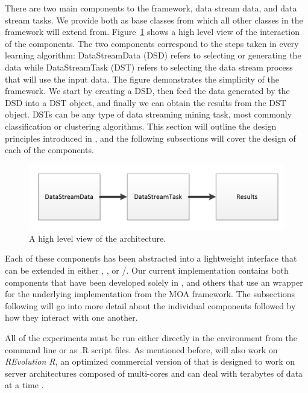 \documentclass[nojss]{jss}
\begin{document}
There are two main components to the  framework, data stream data, and data stream tasks. We provide both as base classes from which all other classes in the framework will extend from. Figure~\ref{figure:workflow}  shows a high level view of the interaction of the components. The two components correspond to the steps taken in every learning algorithm: DataStreamData (DSD) refers to selecting or generating the data while DataStreamTask (DST) refers to selecting the data stream process that will use the input data. The figure demonstrates the simplicity of the framework. We start by creating a DSD, then feed the data generated by the DSD into a DST object, and finally we can obtain the results from the DST object. DSTs can be any type of data streaming mining task, most commonly classification or clustering algorithms. This section will outline the design principles introduced in , and the following subsections will cover the design of each of the components. 

\begin{figure}
\centering
\includegraphics{architecture}
\caption{A high level view of the  architecture.}
\label{figure:workflow}
\end{figure}

Each of these components has been abstracted into a lightweight interface that can be extended in either , , or /. Our current implementation contains both components that have been developed solely in , and others that use an  wrapper for the underlying  implementation from the MOA framework. The subsections following will go into more detail about the individual components followed by how they interact with one another.


All of the experiments must be run either directly in the  environment from the command line or as .R script files. As mentioned before,  will also work on \textit{REvolution R}, an optimized commercial version of  that is designed to work on server architectures composed of multi-cores and can deal with terabytes of data at a time \citep{stream:revolutionR:2010}.
\end{document}
